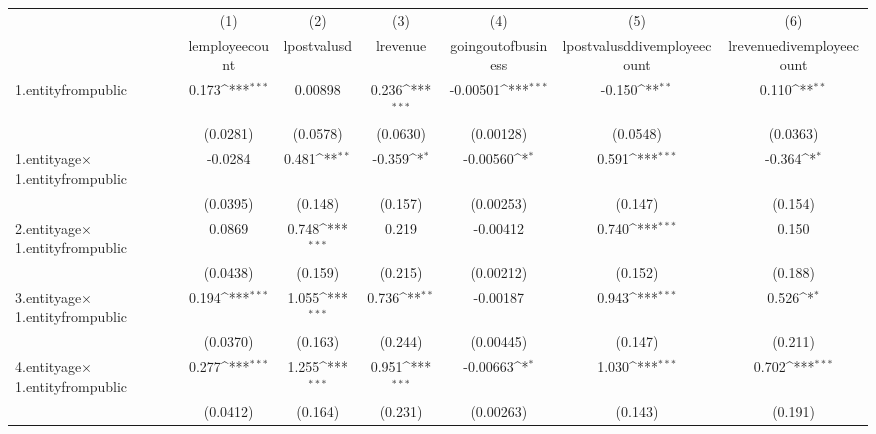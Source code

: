 {
\def\sym#1{\ifmmode^{#1}\else\(^{#1}\)\fi}
\begin{tabular}{l*{6}{c}}
\hline\hline
            &\multicolumn{1}{c}{(1)}&\multicolumn{1}{c}{(2)}&\multicolumn{1}{c}{(3)}&\multicolumn{1}{c}{(4)}&\multicolumn{1}{c}{(5)}&\multicolumn{1}{c}{(6)}\\
            &\multicolumn{1}{c}{lemployeecount}&\multicolumn{1}{c}{lpostvalusd}&\multicolumn{1}{c}{lrevenue}&\multicolumn{1}{c}{goingoutofbusiness}&\multicolumn{1}{c}{lpostvalusddivemployeecount}&\multicolumn{1}{c}{lrevenuedivemployeecount}\\
\hline
1.entityfrompublic&       0.173\sym{***}&     0.00898         &       0.236\sym{***}&    -0.00501\sym{***}&      -0.150\sym{**} &       0.110\sym{**} \\
            &    (0.0281)         &    (0.0578)         &    (0.0630)         &   (0.00128)         &    (0.0548)         &    (0.0363)         \\
[1em]
1.entityage$\times$1.entityfrompublic&     -0.0284         &       0.481\sym{**} &      -0.359\sym{*}  &    -0.00560\sym{*}  &       0.591\sym{***}&      -0.364\sym{*}  \\
            &    (0.0395)         &     (0.148)         &     (0.157)         &   (0.00253)         &     (0.147)         &     (0.154)         \\
[1em]
2.entityage$\times$1.entityfrompublic&      0.0869         &       0.748\sym{***}&       0.219         &    -0.00412         &       0.740\sym{***}&       0.150         \\
            &    (0.0438)         &     (0.159)         &     (0.215)         &   (0.00212)         &     (0.152)         &     (0.188)         \\
[1em]
3.entityage$\times$1.entityfrompublic&       0.194\sym{***}&       1.055\sym{***}&       0.736\sym{**} &    -0.00187         &       0.943\sym{***}&       0.526\sym{*}  \\
            &    (0.0370)         &     (0.163)         &     (0.244)         &   (0.00445)         &     (0.147)         &     (0.211)         \\
[1em]
4.entityage$\times$1.entityfrompublic&       0.277\sym{***}&       1.255\sym{***}&       0.951\sym{***}&    -0.00663\sym{*}  &       1.030\sym{***}&       0.702\sym{***}\\
            &    (0.0412)         &     (0.164)         &     (0.231)         &   (0.00263)         &     (0.143)         &     (0.191)         \\

\end{tabular}}
